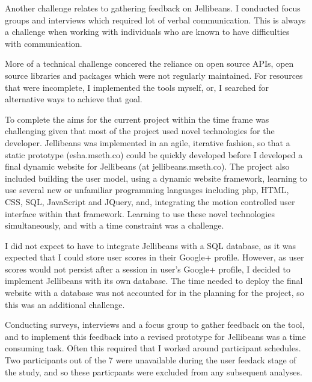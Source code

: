 \documentclass[a4paper, 11pt]{article}
\begin{document}
\vspace{5mm} 
Another challenge relates to gathering feedback on Jellibeans. I conducted focus groups and interviews which required lot of verbal communication. This is always a challenge when working with individuals who are known to have difficulties with communication.

\vspace{5mm}
More of a technical challenge concered the reliance on open source APIs, open source libraries and packages which were not regularly maintained. For resources that were incomplete, I implemented the tools myself, or, I searched for alternative ways to achieve that goal. 

\vspace{5mm}
To complete the aims for the current project within the time frame was challenging given that most of the project used novel technologies for the developer. Jellibeans was implemented in an agile, iterative fashion, so that a static prototype (esha.mseth.co) could be quickly developed before I developed a final dynamic website for Jellibeans (at jellibeans.mseth.co). The project also included building the user model, using a dynamic website framework, learning to use several new or unfamiliar programming languages including php, HTML, CSS, SQL, JavaScript and JQuery, and, integrating the motion controlled user interface within that framework. Learning to use these novel technologies simultaneously, and with a time constraint was a challenge.

\vspace{5mm}
I did not expect to have to integrate Jellibeans with a SQL database, as it was expected that I could store user scores in their Google+ profile. However, as user scores would not persist after a session in user's Google+ profile, I decided to implement Jellibeans with its own database. The time needed to deploy the final website with a database was not accounted for in the planning for the project, so this was an additional challenge.

\vspace{5mm}
Conducting surveys, interviews and a focus group to gather feedback on the tool, and to implement this feedback into a revised prototype for Jellibeans was a time consuming task. Often this required that I worked around participant schedules. Two participants out of the 7 were unavailable during the user feedack stage of the study, and so these particpants were excluded from any subsequent analyses.

\newpage
\end{document}
